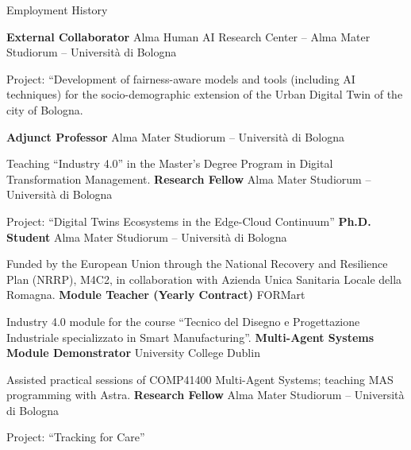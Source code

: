 \setPrefix{\faBriefcase}
\begin{rubric}{Employment History}

    \textbf{External Collaborator} Alma Human AI Research Center -- Alma Mater Studiorum -- Università di Bologna
    \par Project: ``Development of fairness-aware models and tools (including AI techniques) for the socio-demographic extension of the Urban Digital Twin of the city of Bologna.

    \textbf{Adjunct Professor} Alma Mater Studiorum -- Università di Bologna
    \par Teaching ``Industry 4.0'' in the Master's Degree Program in Digital Transformation Management.
%
    \textbf{Research Fellow} Alma Mater Studiorum -- Università di Bologna
    \par Project: ``Digital Twins Ecosystems in the Edge-Cloud Continuum''
%
    \textbf{Ph.D. Student} Alma Mater Studiorum -- Università di Bologna
    \par Funded by the European Union through the National Recovery and Resilience Plan (NRRP), M4C2, in collaboration with Azienda Unica Sanitaria Locale della Romagna.
%
\entry*[2023 -- 2026]
    \textbf{Module Teacher (Yearly Contract)} FORMart
    \par Industry 4.0 module for the course ``Tecnico del Disegno e Progettazione Industriale specializzato in Smart Manufacturing''.
%
    \textbf{Multi-Agent Systems Module Demonstrator} University College Dublin
    \par Assisted practical sessions of COMP41400 Multi-Agent Systems; teaching MAS programming with Astra.
%
    \textbf{Research Fellow} Alma Mater Studiorum -- Università di Bologna
    \par Project: ``Tracking for Care''
%
\end{rubric}
\resetPrefix{}